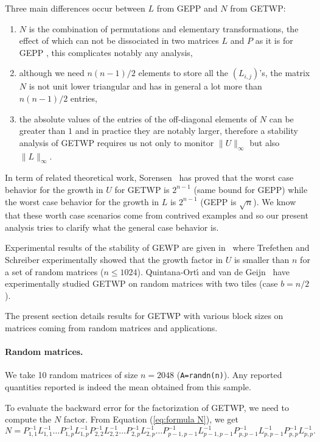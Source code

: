 \documentclass{article}
\begin{document}
Three main differences occur between $L$ from GEPP and $N$ from GETWP:
\begin{enumerate}
\item $N$ is the combination of permutations and elementary transformations, the effect of which can not be dissociated
 in two matrices $L$ and $P$ as it is for GEPP , this complicates notably any analysis,
\item although we need $n(n-1)/2$ elements to store all the $\left(L_{i,j}\right)$'s, the matrix $N$ is not unit lower triangular
and has in general a lot more than $n(n-1)/2$ entries,
\item the absolute values of the entries of the off-diagonal elements of $N$
can be greater than $1$ and in practice they are notably larger, therefore a
stability analysis of GETWP requires us not only to monitor $\|U\|_\infty$ but
also $\|L\|_\infty$.
\end{enumerate}

In term of related theoretical work, Sorensen~\cite{sore:85} has proved that the
worst case behavior for the growth in $U$ for GETWP is $2^{n-1}$ (same bound for GEPP)
while the worst case behavior for the growth in $L$ is $2^{n-1}$ (GEPP is
$\sqrt{n}$). We know that these worth case scenarios come from contrived examples
and so our present analysis tries to clarify what the general case behavior is.

Experimental results of the stability of GEWP are given in~\cite{trsc:90} where
Trefethen and Schreiber experimentally showed that the growth factor in $U$ is
smaller than $n$ for a set of random matrices ($n \leq 1024$).
Quintana-Ort\'{\i} and van de Geijn~\cite{vdgooclu} have experimentally studied
GETWP on random matrices with two tiles (case $b=n/2$).

The present section details results for GETWP with various block sizes on
matrices coming from random matrices and applications.

\paragraph{Random matrices.}

We take 10 random matrices of size $n=2048$ (\texttt{A=randn(n)}). Any reported
quantities reported is indeed the mean obtained from this sample.

To evaluate the backward error for the factorization of GETWP, we need to compute the  $N$ factor.
From Equation (\ref{eq:formula N}), we get
$$
N = 
 P_{1,1}^{-1}
 L_{1,1}^{-1}
 \ldots
 P_{1,p}^{-1}
 L_{1,p}^{-1}
 P_{2,2} ^{-1}
 L_{2,2}^{-1}
 \ldots 
 P_{2,p}^{-1}
 L_{2,p}^{-1}
 \ldots
 P_{p-1,p-1}^{-1}
 L_{p-1,p-1}^{-1}
 P_{p,p-1}^{-1}
 L_{p,p-1}^{-1}
 P_{p,p}  ^{-1}
 L_{p,p}^{-1}.
$$
\end{document}
